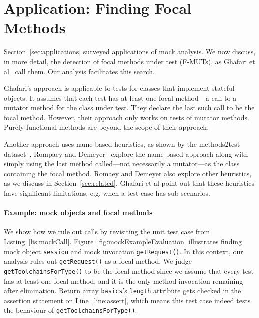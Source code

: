 \section{Application: Finding Focal Methods}
\label{sec:focal}

Section~\ref{sec:applications} surveyed applications of mock analysis.
We now discuss, in more detail, the detection of focal methods under test
(F-MUTs), as Ghafari et
al~\cite{ghafari15:_autom} call them.
Our analysis facilitates this search.

Ghafari's approach is applicable to tests for classes that implement
stateful objects. It assumes that each test has at least one focal
method---a call to a mutator method for the class under test.
They declare the last such call to be the focal method. However, their approach 
only works on tests of mutator methods.  Purely-functional methods are beyond the scope of their approach.

Another approach uses name-based heuristics, 
as shown by the methods2test
dataset~\cite{tufano2020unit}.
Rompaey and
Demeyer~\cite{rompaey09:_estab_traceab_links_unit_test} explore the
name-based approach along with simply using the last method called---not necessarily a mutator---as the class containing the focal method.  Romaey and Demeyer also
explore other heuristics, as we discuss in Section~\ref{sec:related}. Ghafari et al point out
that these heuristics have significant limitations, e.g. when a
test case has sub-scenarios.

\paragraph{Example: mock objects and focal methods} We show how we rule out calls by revisiting the unit test case from Listing~\ref{lis:mockCall}. Figure~\ref{fig:mockExampleEvaluation} illustrates finding mock object \texttt{session} and mock invocation \texttt{getRequest()}. In this context, our analysis rules out \texttt{getRequest()} as a focal method. We judge \texttt{getToolchainsForType()} to be the focal method since we assume that every test has at least one focal method, and it is the only method invocation remaining after elimination. Return array \texttt{basics}'s \texttt{length} attribute gets checked in the assertion statement on Line~\ref{line:assert}, which means this test case indeed tests the behaviour of \texttt{getToolchainsForType()}. 

